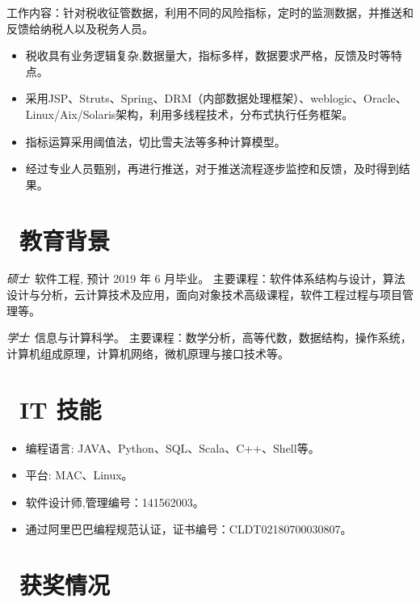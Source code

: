 \documentclass{resume}
\begin{document}
\begin{onehalfspacing}
工作内容：针对税收征管数据，利用不同的风险指标，定时的监测数据，并推送和反馈给纳税人以及税务人员。
\begin{itemize}
  \item 税收具有业务逻辑复杂,数据量大，指标多样，数据要求严格，反馈及时等特点。
  \item 采用JSP、Struts、Spring、DRM（内部数据处理框架）、weblogic、Oracle、Linux/Aix/Solaris架构，利用多线程技术，分布式执行任务框架。
  \item 指标运算采用阈值法，切比雪夫法等多种计算模型。
  \item 经过专业人员甄别，再进行推送，对于推送流程逐步监控和反馈，及时得到结果。
\end{itemize}
\end{onehalfspacing}


\section{\faGraduationCap\  教育背景}
\textit{硕士}\ 软件工程, 预计 2019 年 6 月毕业。
 主要课程：软件体系结构与设计，算法设计与分析，云计算技术及应用，面向对象技术高级课程，软件工程过程与项目管理等。

\textit{学士}\ 信息与计算科学。
 主要课程：数学分析，高等代数，数据结构，操作系统，计算机组成原理，计算机网络，微机原理与接口技术等。



\section{\faCogs\ IT 技能}
\begin{itemize}[parsep=0.5ex]
  \item 编程语言: JAVA、Python、SQL、Scala、C++、Shell等。
  \item 平台: MAC、Linux。
  \item 软件设计师,管理编号：141562003。
  \item 通过阿里巴巴编程规范认证，证书编号：CLDT02180700030807。
\end{itemize}

\section{\faHeartO\ 获奖情况}
\end{document}
